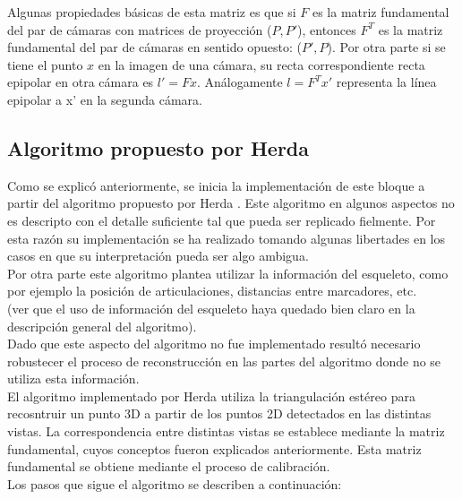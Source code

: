 Algunas propiedades básicas de esta matriz es que si $F$ es la matriz fundamental del par de cámaras con matrices de proyección ($P,P'$), entonces $F^T$ es la matriz fundamental del par de cámaras en sentido opuesto: ($P',P$). Por otra parte si se tiene el punto $x$ en la imagen de una cámara, su recta correspondiente recta epipolar en otra cámara es $l'=Fx$. Análogamente $l=F^Tx'$ representa la línea epipolar a x' en la segunda cámara.

\subsection{Algoritmo propuesto por Herda }

Como se explicó anteriormente, se inicia la implementación de este bloque a partir del algoritmo propuesto por Herda \cite{Herda}. Este algoritmo en algunos aspectos no es descripto con el detalle suficiente tal que pueda ser replicado fielmente. Por esta razón su implementación se ha realizado tomando algunas libertades en los casos en que su interpretación pueda ser algo ambigua.\\

Por otra parte este algoritmo plantea utilizar la información del esqueleto, como por ejemplo la posición de articulaciones, distancias entre marcadores, etc.\\ (ver que el uso de información del esqueleto haya quedado bien claro en la descripción general del algoritmo).\\ Dado que este aspecto del algoritmo no fue implementado resultó necesario robustecer el proceso de reconstrucción en las partes del algoritmo donde no se utiliza esta información.\\


El algoritmo implementado por Herda utiliza la triangulación estéreo para recosntruir un punto 3D a partir de los puntos 2D detectados en las distintas vistas. La correspondencia entre distintas vistas se establece mediante la matriz fundamental, cuyos conceptos fueron explicados anteriormente. Esta matriz fundamental se obtiene mediante el proceso de calibración.\\

Los pasos que sigue el algoritmo se describen a continuación:\


